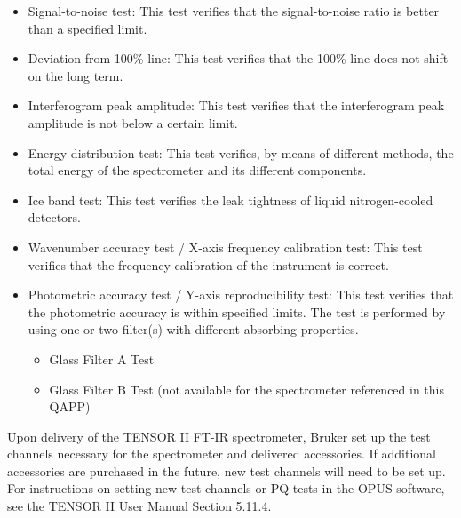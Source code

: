 \begin{itemize}
    \item Signal-to-noise test: This test verifies that the signal-to-noise ratio is better than a specified limit.
    \item Deviation from 100\% line: This test verifies that the 100\% line does not shift on the long term.
    \item Interferogram peak amplitude: This test verifies that the interferogram peak amplitude is not below a certain limit.
    \item Energy distribution test: This test verifies, by means of different methods, the total energy of the spectrometer and its different components.
    \item Ice band test: This test verifies the leak tightness of liquid nitrogen-cooled detectors.
    \item Wavenumber accuracy test / X-axis frequency calibration test: This test verifies that the frequency calibration of the instrument is correct.
    \item Photometric accuracy test / Y-axis reproducibility test: This test verifies that the photometric accuracy is within specified limits. The test is performed by using one or two filter(s) with different absorbing properties.
    \begin{itemize}
        \item Glass Filter A Test
        \item Glass Filter B Test (not available for the spectrometer referenced in this QAPP)
    \end{itemize}
\end{itemize}

Upon delivery of the TENSOR II FT-IR spectrometer, Bruker set up the test channels necessary for the spectrometer and delivered accessories. If additional accessories are purchased in the future, new test channels will need to be set up. For instructions on setting new test channels or PQ tests in the OPUS software, see the TENSOR II User Manual\cite{Bruker1} Section 5.11.4. %

